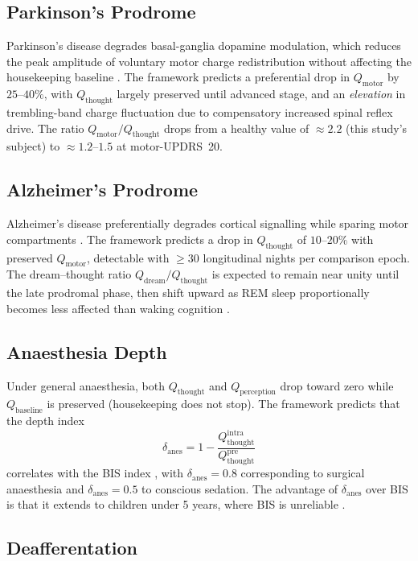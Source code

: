 \documentclass[11pt,twocolumn,a4paper]{article}
\theoremstyle{definition}
\theoremstyle{remark}
\newcommand{\Qth}{Q_{\mathrm{thought}}}
\newcommand{\Qmo}{Q_{\mathrm{motor}}}
\newcommand{\Qpe}{Q_{\mathrm{perception}}}
\newcommand{\Qba}{Q_{\mathrm{baseline}}}
\newcommand{\Qdr}{Q_{\mathrm{dream}}}
\begin{document}
\subsection{Parkinson's Prodrome}

Parkinson's disease degrades basal-ganglia dopamine modulation,
which reduces the peak amplitude of voluntary motor charge
redistribution without affecting the housekeeping baseline
\citep{jankovic2008}. The framework predicts a preferential drop
in $\Qmo$ by $25$--$40\%$, with $\Qth$ largely preserved until
advanced stage, and an \emph{elevation} in trembling-band
charge fluctuation due to compensatory increased spinal reflex
drive. The ratio $\Qmo/\Qth$ drops from a healthy value of
$\approx 2.2$ (this study's subject) to $\approx 1.2$--$1.5$ at
motor-UPDRS~20.

\subsection{Alzheimer's Prodrome}

Alzheimer's disease preferentially degrades cortical signalling
while sparing motor compartments \citep{selkoe2002,bateman2012}. The
framework predicts a drop in $\Qth$ of $10$--$20\%$ with preserved
$\Qmo$, detectable with $\ge 30$ longitudinal nights per comparison
epoch. The dream--thought ratio $\Qdr/\Qth$ is expected to remain
near unity until the late prodromal phase, then shift upward as
REM sleep proportionally becomes less affected than waking cognition
\citep{mander2015}.

\subsection{Anaesthesia Depth}

Under general anaesthesia, both $\Qth$ and $\Qpe$ drop toward zero
while $\Qba$ is preserved (housekeeping does not stop). The
framework predicts that the depth index
\begin{equation}
\delta_{\mathrm{anes}} = 1 - \frac{\Qth^{\mathrm{intra}}}{\Qth^{\mathrm{pre}}}
\end{equation}
correlates with the BIS index \citep{kelley2003}, with
$\delta_{\mathrm{anes}}=0.8$ corresponding to surgical anaesthesia
and $\delta_{\mathrm{anes}}=0.5$ to conscious sedation. The
advantage of $\delta_{\mathrm{anes}}$ over BIS is that it
extends to children under 5 years, where BIS is unreliable
\citep{davidson2005}.

\subsection{Deafferentation}
\end{document}
